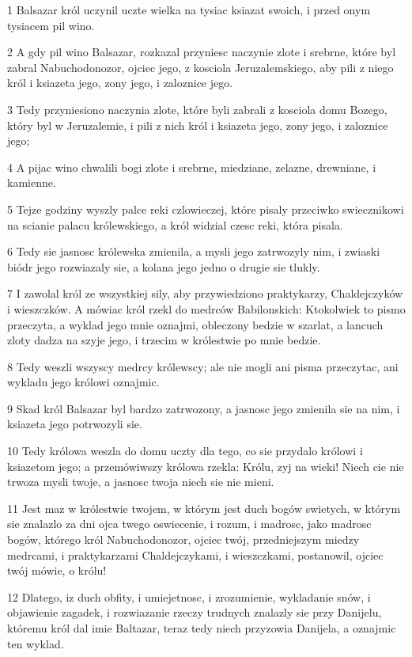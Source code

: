 \par 1 Balsazar król uczynil uczte wielka na tysiac ksiazat swoich, i przed onym tysiacem pil wino.
\par 2 A gdy pil wino Balsazar, rozkazal przyniesc naczynie zlote i srebrne, które byl zabral Nabuchodonozor, ojciec jego, z kosciola Jeruzalemskiego, aby pili z niego król i ksiazeta jego, zony jego, i zaloznice jego.
\par 3 Tedy przyniesiono naczynia zlote, które byli zabrali z kosciola domu Bozego, który byl w Jeruzalemie, i pili z nich król i ksiazeta jego, zony jego, i zaloznice jego;
\par 4 A pijac wino chwalili bogi zlote i srebrne, miedziane, zelazne, drewniane, i kamienne.
\par 5 Tejze godziny wyszly palce reki czlowieczej, które pisaly przeciwko swiecznikowi na scianie palacu królewskiego, a król widzial czesc reki, która pisala.
\par 6 Tedy sie jasnosc królewska zmienila, a mysli jego zatrwozyly nim, i zwiaski biódr jego rozwiazaly sie, a kolana jego jedno o drugie sie tlukly.
\par 7 I zawolal król ze wszystkiej sily, aby przywiedziono praktykarzy, Chaldejczyków i wieszczków. A mówiac król rzekl do medrców Babilonskich: Ktokolwiek to pismo przeczyta, a wyklad jego mnie oznajmi, obleczony bedzie w szarlat, a lancuch zloty dadza na szyje jego, i trzecim w królestwie po mnie bedzie.
\par 8 Tedy weszli wszyscy medrcy królewscy; ale nie mogli ani pisma przeczytac, ani wykladu jego królowi oznajmic.
\par 9 Skad król Balsazar byl bardzo zatrwozony, a jasnosc jego zmienila sie na nim, i ksiazeta jego potrwozyli sie.
\par 10 Tedy królowa weszla do domu uczty dla tego, co sie przydalo królowi i ksiazetom jego; a przemówiwszy królowa rzekla: Królu, zyj na wieki! Niech cie nie trwoza mysli twoje, a jasnosc twoja niech sie nie mieni.
\par 11 Jest maz w królestwie twojem, w którym jest duch bogów swietych, w którym sie znalazlo za dni ojca twego oswiecenie, i rozum, i madrosc, jako madrosc bogów, którego król Nabuchodonozor, ojciec twój, przedniejszym miedzy medrcami, i praktykarzami Chaldejczykami, i wieszczkami, postanowil, ojciec twój mówie, o królu!
\par 12 Dlatego, iz duch obfity, i umiejetnosc, i zrozumienie, wykladanie snów, i objawienie zagadek, i rozwiazanie rzeczy trudnych znalazly sie przy Danijelu, któremu król dal imie Baltazar, teraz tedy niech przyzowia Danijela, a oznajmic ten wyklad.
